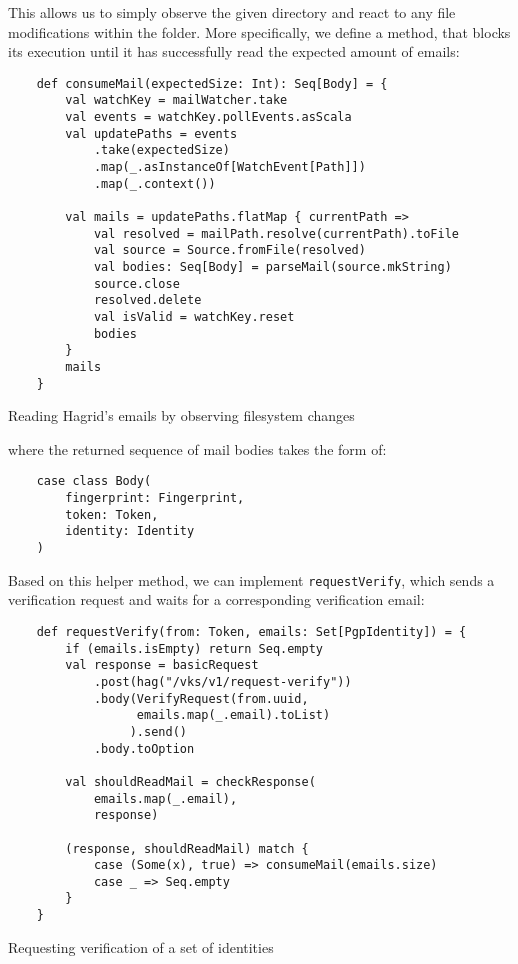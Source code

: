 This allows us to simply observe the given directory and react to any file modifications within the folder.
More specifically, we define a method, that blocks its execution until it has successfully read the expected amount of emails: 
\begin{code}
    \begin{verbatim}
    def consumeMail(expectedSize: Int): Seq[Body] = {
        val watchKey = mailWatcher.take
        val events = watchKey.pollEvents.asScala
        val updatePaths = events
            .take(expectedSize)
            .map(_.asInstanceOf[WatchEvent[Path]])
            .map(_.context())
    
        val mails = updatePaths.flatMap { currentPath =>
            val resolved = mailPath.resolve(currentPath).toFile
            val source = Source.fromFile(resolved)
            val bodies: Seq[Body] = parseMail(source.mkString)
            source.close
            resolved.delete
            val isValid = watchKey.reset
            bodies
        }
        mails
    }
    \end{verbatim}
    \caption{Reading Hagrid's emails by observing filesystem changes}
\end{code}
\label{code:consumeMail}
where the returned sequence of mail bodies takes the form of:
\begin{verbatim}
    case class Body(
        fingerprint: Fingerprint, 
        token: Token, 
        identity: Identity
    )
\end{verbatim}

Based on this helper method, we can implement \texttt{requestVerify}, which sends a verification request and waits for a corresponding verification email:
\begin{code}
    \begin{verbatim}
    def requestVerify(from: Token, emails: Set[PgpIdentity]) = {
        if (emails.isEmpty) return Seq.empty
        val response = basicRequest
            .post(hag("/vks/v1/request-verify"))
            .body(VerifyRequest(from.uuid, 
                  emails.map(_.email).toList)
                 ).send()
            .body.toOption

        val shouldReadMail = checkResponse(
            emails.map(_.email), 
            response)

        (response, shouldReadMail) match {
            case (Some(x), true) => consumeMail(emails.size)
            case _ => Seq.empty
        }
    }
    \end{verbatim}
    \caption{Requesting verification of a set of identities}
\end{code}

